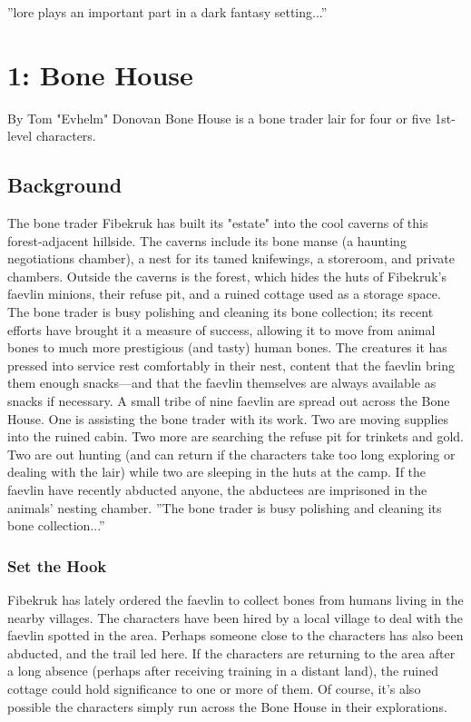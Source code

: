 \documentclass[10pt,a4paper,twoside,twocolumn,openany,bg=print,nodeprecatedcode]{dndbook}
\begin{document}
\DndQuote%
{}
{''lore plays an important part in a dark fantasy setting...''}
{}
\chapter{1: Bone House}
By Tom "Evhelm" Donovan
Bone House is a bone trader lair for four or five 1st-level characters.
\section{Background}
The bone trader Fibekruk has built its "estate" into the cool caverns of this forest-adjacent hillside. The caverns include its bone manse (a haunting negotiations chamber), a nest for its tamed knifewings, a storeroom, and private chambers. Outside the caverns is the forest, which hides the huts of Fibekruk's faevlin minions, their refuse pit, and a ruined cottage used as a storage space.
The bone trader is busy polishing and cleaning its bone collection; its recent efforts have brought it a measure of success, allowing it to move from animal bones to much more prestigious (and tasty) human bones. The creatures it has pressed into service rest comfortably in their nest, content that the faevlin bring them enough snacks—and that the faevlin themselves are always available as snacks if necessary. A small tribe of nine faevlin are spread out across the Bone House. One is assisting the bone trader with its work. Two are moving supplies into the ruined cabin. Two more are searching the refuse pit for trinkets and gold. Two are out hunting (and can return if the characters take too long exploring or dealing with the lair) while two are sleeping in the huts at the camp. If the faevlin have recently abducted anyone, the abductees are imprisoned in the animals' nesting chamber.
\DndQuote%
{}
{''The bone trader is busy polishing and cleaning its bone collection...''}
{}
\subsection{Set the Hook}
Fibekruk has lately ordered the faevlin to collect bones from humans living in the nearby villages. The characters have been hired by a local village to deal with the faevlin spotted in the area. Perhaps someone close to the characters has also been abducted, and the trail led here. If the characters are returning to the area after a long absence (perhaps after receiving training in a distant land), the ruined cottage could hold significance to one or more of them. Of course, it's also possible the characters simply run across the Bone House in their explorations.
\end{document}
